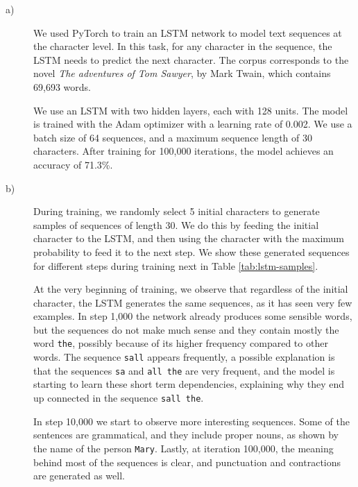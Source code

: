 \documentclass{article}
\begin{document}
\begin{description}
\item[a)] We used PyTorch to train an LSTM network to model text sequences at the character level. In this task, for any character in the sequence, the LSTM needs to predict the next character. The corpus corresponds to the novel \textit{The adventures of Tom Sawyer}, by Mark Twain, which contains 69,693 words.


We use an LSTM with two hidden layers, each with 128 units. The model is trained with the Adam optimizer \cite{kingma2014adam} with a learning rate of 0.002. We use a batch size of 64 sequences, and a maximum sequence length of 30 characters. After training for 100,000 iterations, the model achieves an accuracy of 71.3\%.

\item[b)] During training, we randomly select 5 initial characters to generate samples of sequences of length 30. We do this by feeding the initial character to the LSTM, and then using the character with the maximum probability to feed it to the next step. We show these generated sequences for different steps during training next in Table \ref{tab:lstm-samples}.

At the very beginning of training, we observe that regardless of the initial character, the LSTM generates the same sequences, as it has seen very few examples. In step 1,000 the network already produces some sensible words, but the sequences do not make much sense and they contain mostly the word \texttt{the}, possibly because of its higher frequency compared to other words. The sequence \texttt{sall} appears frequently, a possible explanation is that the sequences \texttt{sa} and \texttt{all the} are very frequent, and the model is starting to learn these short term dependencies, explaining why they end up connected in the sequence \texttt{sall the}.

In step 10,000 we start to observe more interesting sequences. Some of the sentences are grammatical, and they include proper nouns, as shown by the name of the person \texttt{Mary}. Lastly, at iteration 100,000, the meaning behind most of the sequences is clear, and punctuation and contractions are generated as well.



\end{description}
\end{document}
